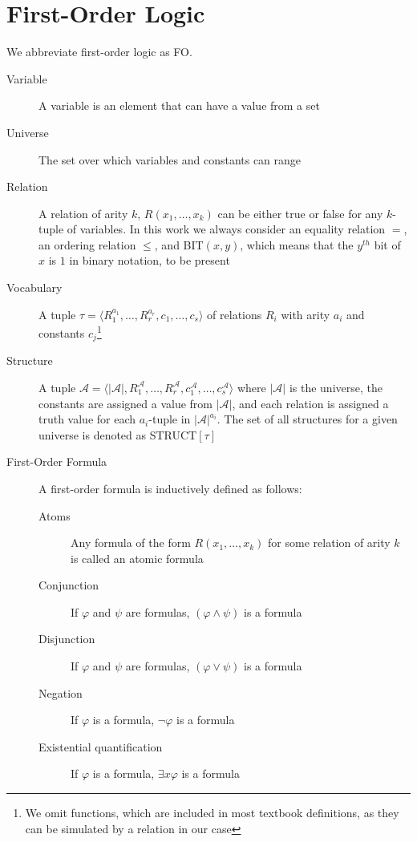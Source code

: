 \section{First-Order Logic}\label{sec:first-order-logic}
We abbreviate first-order logic as FO\@.
\begin{description}
    \item[Variable] A variable is an element that can have a value from a set
    \item[Universe] The set over which variables and constants can range
    \item[Relation] A relation of arity $k$, $R(x_1, \dots, x_k)$ can be either true or false for any $k$-tuple of variables.
    In this work we always consider an equality relation $=$, an ordering relation $\leq$, and BIT$(x, y)$, which means that the $y^{th}$ bit of $x$ is $1$ in binary notation, to be present
    \item[Vocabulary] A tuple $\tau = \langle R_1^{a_1}, \dots, R_r^{a_r}, c_1, \dots, c_s \rangle$ of relations $R_i$ with arity $a_i$ and constants $c_j$\footnote{We omit functions, which are included in most textbook definitions, as they can be simulated by a relation in our case}
    \item[Structure] A tuple $\mathcal{A} = \langle |\mathcal{A}|, R_1^{\mathcal{A}}, \dots, R_r^{\mathcal{A}}, c_1^{\mathcal{A}}, \dots, c_s^{\mathcal{A}} \rangle$ where $|\mathcal{A}|$ is the universe, the constants are assigned a value from $|\mathcal{A}|$, and each relation is assigned a truth value for each $a_i$-tuple in $|\mathcal{A}|^{a_i}$.
    The set of all structures for a given universe is denoted as STRUCT$[\tau]$
    \item[First-Order Formula] A first-order formula is inductively defined as follows:
    \begin{description}
        \item[Atoms] Any formula of the form $R(x_1, \dots, x_k)$ for some relation of arity $k$ is called an atomic formula
        \item[Conjunction] If $\varphi$ and $\psi$ are formulas, $(\varphi \land \psi)$ is a formula
        \item[Disjunction] If $\varphi$ and $\psi$ are formulas, $(\varphi \lor \psi)$ is a formula
        \item[Negation] If $\varphi$ is a formula, $\lnot \varphi$ is a formula
        \item[Existential quantification] If $\varphi$ is a formula, $\exists x \varphi$ is a formula

\end{description}
\end{description}
